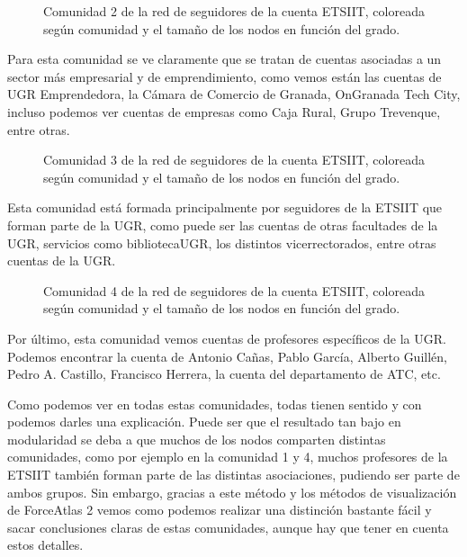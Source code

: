 \newpage
\begin{figure}[H]
	\centering
	
	\caption{Comunidad 2 de la red de seguidores de la cuenta ETSIIT, coloreada según comunidad y el tamaño de los nodos en función del grado.}
\end{figure}
\vspace{18cm}
Para esta comunidad se ve claramente que se tratan de cuentas asociadas a un sector más empresarial y de emprendimiento, como vemos están las cuentas de UGR Emprendedora, la Cámara de Comercio de Granada, OnGranada Tech City, incluso podemos ver cuentas de empresas como Caja Rural, Grupo Trevenque, entre otras.
\newpage


\newpage
\begin{figure}[H]
	\centering
	
	\caption{Comunidad 3 de la red de seguidores de la cuenta ETSIIT, coloreada según comunidad y el tamaño de los nodos en función del grado.}
\end{figure}
\vspace{18cm}
Esta comunidad está formada principalmente por seguidores de la ETSIIT que forman parte de la UGR, como puede ser las cuentas de otras facultades de la UGR, servicios como bibliotecaUGR, los distintos vicerrectorados, entre otras cuentas de la UGR.
\newpage


\newpage
\begin{figure}[H]
	\centering
	
	\caption{Comunidad 4 de la red de seguidores de la cuenta ETSIIT, coloreada según comunidad y el tamaño de los nodos en función del grado.}
\end{figure}
\vspace{18cm}
Por último, esta comunidad vemos cuentas de profesores específicos de la UGR. Podemos encontrar la cuenta de Antonio Cañas, Pablo García, Alberto Guillén, Pedro A. Castillo, Francisco Herrera, la cuenta del departamento de ATC, etc.
\newpage

Como podemos ver en todas estas comunidades, todas tienen sentido y con podemos darles una explicación. Puede ser que el resultado tan bajo en modularidad se deba a que muchos de los nodos comparten distintas comunidades, como por ejemplo en la comunidad 1 y 4, muchos profesores de la ETSIIT también forman parte de las distintas asociaciones, pudiendo ser parte de ambos grupos. Sin embargo, gracias a este método y los métodos de visualización de ForceAtlas 2 vemos como podemos realizar una distinción bastante fácil y sacar conclusiones claras de estas comunidades, aunque hay que tener en cuenta estos detalles.



